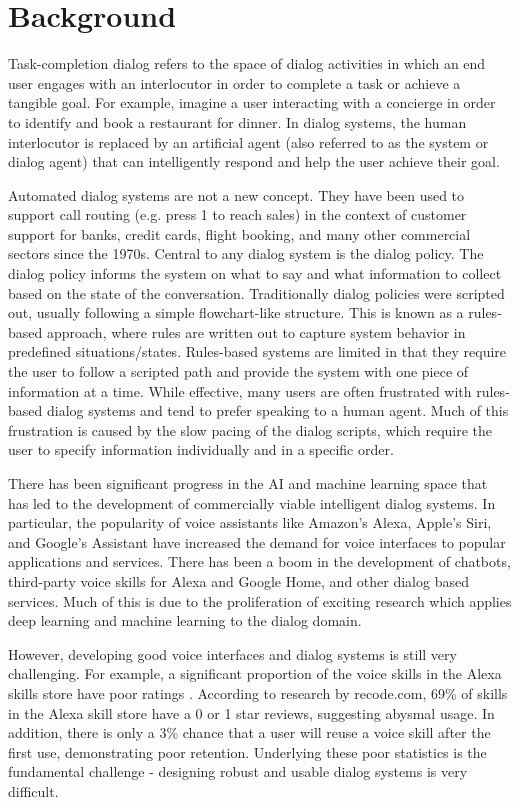 \section{Background}

Task-completion dialog refers to the space of dialog activities in which an end user engages with an interlocutor in order to complete a task or achieve a tangible goal. For example, imagine a user interacting with a concierge in order to identify and book a restaurant for dinner. In dialog systems, the human interlocutor is replaced by an artificial agent (also referred to as the system or dialog agent) that can intelligently respond and help the user achieve their goal.

Automated dialog systems are not a new concept. They have been used to support call routing (e.g. press 1 to reach sales) in the context of customer support for banks, credit cards, flight booking, and many other commercial sectors since the 1970s. Central to any dialog system is the dialog policy. The dialog policy informs the system on what to say and what information to collect based on the state of the conversation. Traditionally dialog policies were scripted out, usually following a simple flowchart-like structure. This is known as a rules-based approach, where rules are written out to capture system behavior in predefined situations/states. Rules-based systems are limited in that they require the user to follow a scripted path and provide the system with one piece of information at a time. While effective, many users are often frustrated with rules-based dialog systems and tend to prefer speaking to a human agent. Much of this frustration is caused by the slow pacing of the dialog scripts, which require the user to specify information individually and in a specific order. 

There has been significant progress in the AI and machine learning space that has led to the development of commercially viable intelligent dialog systems. In particular, the popularity of voice assistants like Amazon's Alexa, Apple's Siri, and Google's Assistant have increased the demand for voice interfaces to popular applications and services. There has been a boom in the development of chatbots, third-party voice skills for Alexa and Google Home, and other dialog based services. Much of this is due to the proliferation of exciting research which applies deep learning and machine learning to the dialog domain. 

However, developing good voice interfaces and dialog systems is still very challenging. For example, a significant proportion of the voice skills in the Alexa skills store have poor ratings \cite{rey_2017}. According to research by recode.com, 69\% of skills in the Alexa skill store have a 0 or 1  star reviews, suggesting abysmal usage. In addition, there is only a 3\% chance that a user will reuse a voice skill after the first use, demonstrating poor retention. Underlying these poor statistics is the fundamental challenge - designing robust and usable dialog systems is very difficult. 
 
